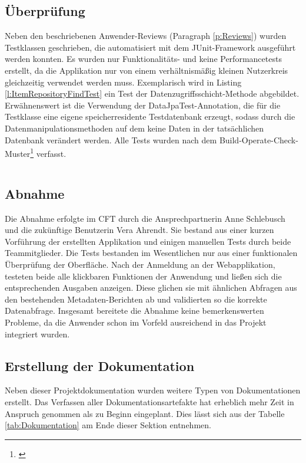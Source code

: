 \subsection{Überprüfung}\label{sec:Ueberpruefung}
Neben den beschriebenen Anwender-Reviews (Paragraph \ref{p:Reviews}) wurden Testklassen geschrieben, die automatisiert mit dem JUnit-Framework ausgeführt werden konnten. Es wurden nur Funktionalitäts- und keine Performancetests erstellt, da die Applikation nur von einem verhältnismäßig kleinen Nutzerkreis gleichzeitig verwendet werden muss. Exemplarisch wird in Listing \ref{l:ItemRepositoryFindTest} ein Test der Datenzugriffsschicht-Methode  abgebildet. Erwähnenswert ist die Verwendung der DataJpaTest-Annotation, die für die Testklasse eine eigene speicherresidente Testdatenbank erzeugt, sodass durch die Datenmanipulationsmethoden auf dem  keine Daten in der tatsächlichen Datenbank verändert werden. Alle Tests wurden nach dem Build-Operate-Check-Muster\footnote{\cite{fitnesse:boc}} verfasst.
\begin{listing}[ht]
  \inputminted{java}{Listings/ItemRepositoryFindTest.java}
  \caption{}
  \label{l:ItemRepositoryFindTest}
\end{listing}

\clearpage

\subsection{Abnahme}
\label{sec:Abnahme}
Die Abnahme erfolgte im \ac{CFT} \teamName durch die Ansprechpartnerin Anne Schlebusch und die zukünftige Benutzerin Vera Ahrendt. Sie bestand aus einer kurzen Vorführung der erstellten Applikation und einigen manuellen Tests durch beide Teammitglieder. Die Tests bestanden im Wesentlichen nur aus einer funktionalen Überprüfung der Oberfläche. Nach der Anmeldung an der Webapplikation, testeten beide alle klickbaren Funktionen der Anwendung und ließen sich die entsprechenden Ausgaben anzeigen. Diese glichen sie mit ähnlichen Abfragen aus den bestehenden Metadaten-Berichten ab und validierten so die korrekte Datenabfrage. Insgesamt bereitete die Abnahme keine bemerkenswerten Probleme, da die Anwender schon im Vorfeld ausreichend in das Projekt integriert wurden.

\subsection{Erstellung der Dokumentation}\label{sec:Dokumentation}
Neben dieser Projektdokumentation wurden weitere Typen von Dokumentationen erstellt. Das Verfassen aller Dokumentationsartefakte hat erheblich mehr Zeit in Anspruch genommen als zu Beginn eingeplant. Dies lässt sich aus der Tabelle \ref{tab:Dokumentation} am Ende dieser Sektion entnehmen.

